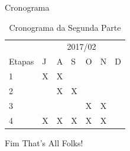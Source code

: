 \documentclass{beamer}
\begin{document}
\begin{frame}[t]{Cronograma}
    \begin{table}[h!]
    \centering
    \caption{Cronograma da Segunda Parte}
    \label{cronograma}
    \begin{tabular}{|l|l|l|l|l|l|l|l|}
    \hline
    \multicolumn{2}{|c|}{}                         & \multicolumn{6}{c|}{2017/02}                                                                                                                                                           \\ \cline{3-8} 
    \multicolumn{2}{|c|}{\multirow{-2}{*}{Etapas}} & J                                               & A                        & S                                               & O                        & N                        & D \\ \hline
    \multicolumn{2}{|l|}{1}                         & X & X &                                                 &                          &                          &   \\ \hline
    \multicolumn{2}{|l|}{2}                         &                                                 & X & X &                          &                          &   \\ \hline
    \multicolumn{2}{|l|}{3}                         &                                                 &                          &                                                 & X & X &   \\ \hline
    \multicolumn{2}{|l|}{4}                         & X                        & X & X                & X & X &   \\ \hline
    \end{tabular}
\end{table}
    
\end{frame}

\begin{frame}{Fim}
    \centering
    \LARGE{That's All Folks!}
\end{frame}
\end{document}
